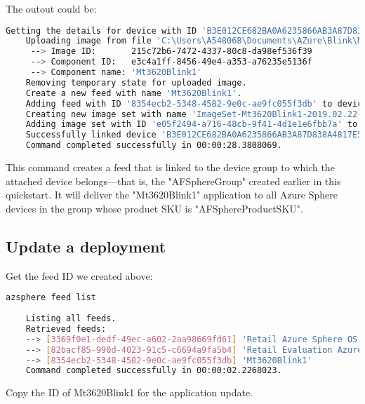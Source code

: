 \begin{enumerate}
    The outout could be:
    \begin{lstlisting}[language=bash]
    Getting the details for device with ID 'B3E012CE682BA0A6235866AB3A87D838A4817E5C539832A34BF7A715CA8D015FF99C84B909CB2886916259AD186B212E148FC9C4BF8BB6A275A11A2B9495D578'.
    Uploading image from file 'C:\Users\A548068\Documents\AZure\Blink\Mt3620Blink1\Mt3620Blink1\bin\ARM\Debug\Mt3620Blink1.imagepackage':
     --> Image ID:       215c72b6-7472-4337-80c8-da98ef536f39
     --> Component ID:   e3c4a1ff-8456-49e4-a353-a76235e5136f
     --> Component name: 'Mt3620Blink1'
    Removing temporary state for uploaded image.
    Create a new feed with name 'Mt3620Blink1'.
    Adding feed with ID '8354ecb2-5348-4582-9e0c-ae9fc055f3db' to device group with ID '5ece1a6b-44b8-40cb-b0e3-623dccd5bc6e'.
    Creating new image set with name 'ImageSet-Mt3620Blink1-2019.02.22-16.15.07+01:00' for images with these IDs: 215c72b6-7472-4337-80c8-da98ef536f39.
    Adding image set with ID 'e05f2494-a716-48cb-9f41-4d1e1e6fbb7a' to feed with ID '8354ecb2-5348-4582-9e0c-ae9fc055f3db'.
    Successfully linked device 'B3E012CE682BA0A6235866AB3A87D838A4817E5C539832A34BF7A715CA8D015FF99C84B909CB2886916259AD186B212E148FC9C4BF8BB6A275A11A2B9495D578' to feed with ID '8354ecb2-5348-4582-9e0c-ae9fc055f3db'.
    Command completed successfully in 00:00:28.3808069.
    \end{lstlisting}
    
    This command creates a feed that is linked to the device group to which the attached device belongs—that is, the "AFSphereGroup"  created earlier in this quickstart. It will deliver the "Mt3620Blink1" application to all Azure Sphere devices in the group whose product SKU is "AFSphereProductSKU".
\end{enumerate}

\subsection{Update a deployment}
Get the feed ID we created above:
\begin{lstlisting}[language=bash]
    azsphere feed list
    
    Listing all feeds.
    Retrieved feeds:
    --> [3369f0e1-dedf-49ec-a602-2aa98669fd61] 'Retail Azure Sphere OS'
    --> [82bacf85-990d-4023-91c5-c6694a9fa5b4] 'Retail Evaluation Azure Sphere OS'
    --> [8354ecb2-5348-4582-9e0c-ae9fc055f3db] 'Mt3620Blink1'
    Command completed successfully in 00:00:02.2268023.
\end{lstlisting}
Copy the ID of Mt3620Blink1 for the application update.

